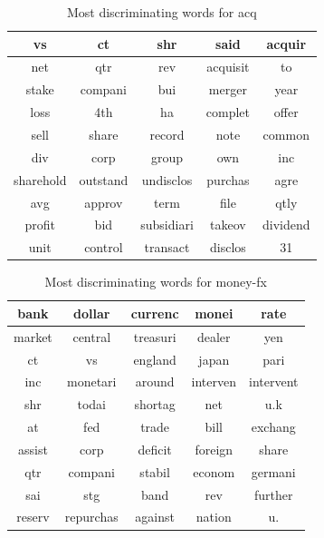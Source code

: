 \documentclass{article}
\begin{document}
\begin{table}[H]
	\caption{Most discriminating words for acq}
	\centering
	\begin{tabular}{|c|c|c|c|c|}
		\hline
		vs & ct & shr & said & acquir \\
		\hline
		net & qtr & rev & acquisit & to \\
		\hline
		stake & compani & bui & merger & year \\
		\hline
		loss & 4th & ha & complet & offer \\
		\hline
		sell & share & record & note & common \\
		\hline
		div & corp & group & own & inc \\
		\hline
		sharehold & outstand & undisclos & purchas & agre \\
		\hline
		avg & approv & term & file & qtly \\
		\hline
		profit & bid & subsidiari & takeov & dividend \\
		\hline
		unit & control & transact & disclos & 31 \\
		\hline
	\end{tabular}
\end{table}

\begin{table}[H]
	\caption{Most discriminating words for money-fx}
	\centering
	\begin{tabular}{|c|c|c|c|c|}
		\hline
		bank & dollar & currenc & monei & rate \\
		\hline
		market & central & treasuri & dealer & yen \\
		\hline
		ct & vs & england & japan & pari \\
		\hline
		inc & monetari & around & interven & intervent \\
		\hline
		shr & todai & shortag & net & u.k \\
		\hline
		at & fed & trade & bill & exchang \\
		\hline
		assist & corp & deficit & foreign & share \\
		\hline
		qtr & compani & stabil & econom & germani \\
		\hline
		sai & stg & band & rev & further \\
		\hline
		reserv & repurchas & against & nation & u. \\
		\hline
	\end{tabular}
\end{table}
\end{document}
